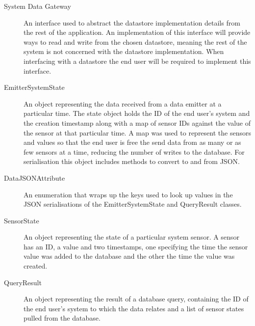 \documentclass[10pt,a4paper]{article}
\begin{document}
\begin{description}
  \item [System Data Gateway] An interface used to abstract the
    datastore implementation details from the rest of the
    application. An implementation of this interface will provide ways
    to read and write from the chosen datastore, meaning the rest of the
    system is not concerned with the datastore implementation. When
    interfacing with a datastore the end user will be required to
    implement this interface.

  \item [EmitterSystemState] An object representing the data received
    from a data emitter at a particular time. The state object holds
    the ID of the end user's system and the creation timestamp along
    with a map of sensor IDs against the value of the sensor at that
    particular time. A map was used to represent the sensors and
    values so that the end user is free the send data from as many or
    as few sensors at a time, reducing the number of writes to the
    database. For serialisation this object includes methods to
    convert to and from JSON.

  \item [DataJSONAttribute] An enumeration that wraps up the keys used
    to look up values in the JSON serialisations of the
    EmitterSystemState and QueryResult classes.

  \item [SensorState] An object representing the state of a particular
    system sensor. A sensor has an ID, a value and two timestamps, one
    specifying the time the sensor value was added to the database and
    the other the time the value was created.

  \item [QueryResult] An object representing the result of a database
    query, containing the ID of the end user's system to which the
    data relates and a list of sensor states pulled from the database.
\end{description}
\end{document}
